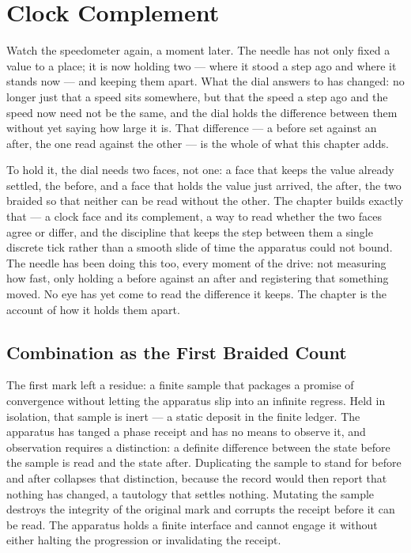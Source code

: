 \chapter{Clock Complement}

Watch the speedometer again, a moment later. The needle has not only fixed a value to a place; it is now holding two --- where it stood a step ago and where it stands now --- and keeping them apart. What the dial answers to has changed: no longer just that a speed sits somewhere, but that the speed a step ago and the speed now need not be the same, and the dial holds the difference between them without yet saying how large it is. That difference --- a before set against an after, the one read against the other --- is the whole of what this chapter adds.

To hold it, the dial needs two faces, not one: a face that keeps the value already settled, the before, and a face that holds the value just arrived, the after, the two braided so that neither can be read without the other. The chapter builds exactly that --- a clock face and its complement, a way to read whether the two faces agree or differ, and the discipline that keeps the step between them a single discrete tick rather than a smooth slide of time the apparatus could not bound. The needle has been doing this too, every moment of the drive: not measuring how fast, only holding a before against an after and registering that something moved. No eye has yet come to read the difference it keeps. The chapter is the account of how it holds them apart.

\section{Combination as the First Braided Count}

The first mark left a residue: a finite sample that packages a promise of convergence without letting the apparatus slip into an infinite regress. Held in isolation, that sample is inert --- a static deposit in the finite ledger. The apparatus has tanged a phase receipt and has no means to observe it, and observation requires a distinction: a definite difference between the state before the sample is read and the state after. Duplicating the sample to stand for before and after collapses that distinction, because the record would then report that nothing has changed, a tautology that settles nothing. Mutating the sample destroys the integrity of the original mark and corrupts the receipt before it can be read. The apparatus holds a finite interface and cannot engage it without either halting the progression or invalidating the receipt. 

